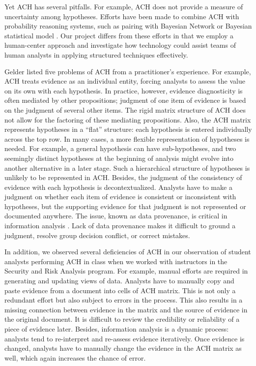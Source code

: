 Yet ACH has several pitfalls. For example, ACH does not provide a measure of uncertainty among hypotheses. Efforts have been made to combine ACH with probability reasoning systems, such as pairing with Bayesian Network \citep{Karvetski2013} or Bayesian statistical model \citep{Duncan2008}. Our project differs from these efforts in that we employ a human-center approach and investigate how technology could assist teams of human analysts in applying structured techniques effectively.

Gelder \cite{Gelder2008} listed five problems of ACH from a practitioner’s experience. For example, ACH treats evidence as an individual entity, forcing analysts to assess the value on its own with each hypothesis. In practice, however, evidence diagnosticity is often mediated by other propositions; judgment of one item of evidence is based on the judgment of several other items. The rigid matrix structure of ACH does not allow for the factoring of these mediating propositions. Also, the ACH matrix represents hypotheses in a “flat” structure: each hypothesis is entered individually across the top row. In many cases, a more flexible representation of hypotheses is needed. For example, a general hypothesis can have sub-hypotheses, and two seemingly distinct hypotheses at the beginning of analysis might evolve into another alternative in a later stage. Such a hierarchical structure of hypotheses is unlikely to be represented in ACH. Besides, the judgment of the consistency of evidence with each hypothesis is decontextualized. Analysts have to make a judgment on whether each item of evidence is consistent or inconsistent with hypotheses, but the supporting evidence for that judgment is not represented or documented anywhere. The issue, known as data provenance, is critical in information analysis \citep{Chin2009}. Lack of data provenance makes it difficult to ground a judgment, resolve group decision conflict, or correct mistakes. 

In addition, we observed several deficiencies of ACH in our observation of student analysts performing ACH in class when we worked with instructors in the Security and Risk Analysis program. For example, manual efforts are required in generating and updating views of data. Analysts have to manually copy and paste evidence from a document into cells of ACH matrix. This is not only a redundant effort but also subject to errors in the process. This also results in a missing connection between evidence in the matrix and the source of evidence in the original document. It is difficult to review the credibility or reliability of a piece of evidence later. Besides, information analysis is a dynamic process: analysts tend to re-interpret and re-assess evidence iteratively. Once evidence is changed, analysts have to manually change the evidence in the ACH matrix as well, which again increases the chance of error.

